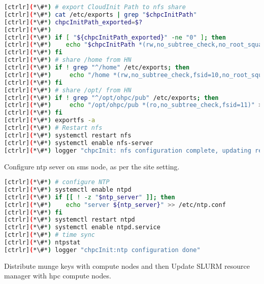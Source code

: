 \begin{lstlisting}[language=bash,keywords={}]
[ctrlr](*\#*) # export CloudInit Path to nfs share
[ctrlr](*\#*) cat /etc/exports | grep "$chpcInitPath"
[ctrlr](*\#*) chpcInitPath_exported=$?
[ctrlr](*\#*) 
[ctrlr](*\#*) if [ "${chpcInitPath_exported}" -ne "0" ]; then
[ctrlr](*\#*)    echo "$chpcInitPath *(rw,no_subtree_check,no_root_squash)" >> /etc/exports
[ctrlr](*\#*) fi
[ctrlr](*\#*) # share /home from HN
[ctrlr](*\#*) if ! grep "^/home" /etc/exports; then
[ctrlr](*\#*)     echo "/home *(rw,no_subtree_check,fsid=10,no_root_squash)" >> /etc/exports
[ctrlr](*\#*) fi
[ctrlr](*\#*) # share /opt/ from HN
[ctrlr](*\#*) if ! grep "^/opt/ohpc/pub" /etc/exports; then
[ctrlr](*\#*)     echo "/opt/ohpc/pub *(ro,no_subtree_check,fsid=11)" >> /etc/exports
[ctrlr](*\#*) fi
[ctrlr](*\#*) exportfs -a
[ctrlr](*\#*) # Restart nfs
[ctrlr](*\#*) systemctl restart nfs
[ctrlr](*\#*) systemctl enable nfs-server
[ctrlr](*\#*) logger "chpcInit: nfs configuration complete, updating remaining HPC configuration" 
\end{lstlisting} 

Configure ntp sever on sms node, as per the site setting.


\begin{lstlisting}[language=bash,keywords={}]
[ctrlr](*\#*) # configure NTP
[ctrlr](*\#*) systemctl enable ntpd
[ctrlr](*\#*) if [[ ! -z "$ntp_server" ]]; then
[ctrlr](*\#*)    echo "server ${ntp_server}" >> /etc/ntp.conf
[ctrlr](*\#*) fi
[ctrlr](*\#*) systemctl restart ntpd
[ctrlr](*\#*) systemctl enable ntpd.service
[ctrlr](*\#*) # time sync
[ctrlr](*\#*) ntpstat
[ctrlr](*\#*) logger "chpcInit:ntp configuration done"
\end{lstlisting} 

Distribute munge keys with compute nodes and then Update SLURM resource manager with hpc compute nodes.



